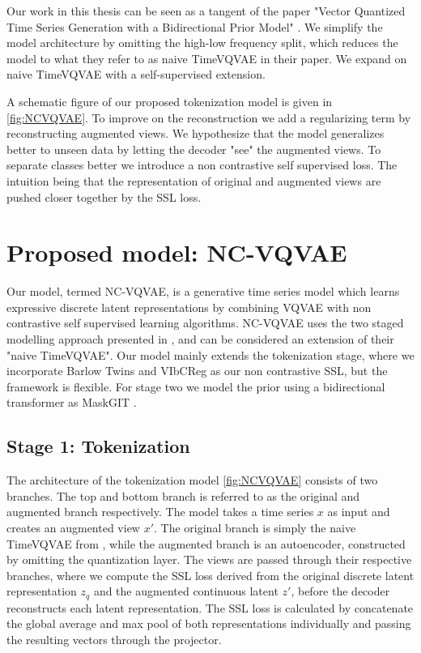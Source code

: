 \documentclass[../../thesis.tex]{subfiles}
\begin{document}
Our work in this thesis can be seen as a tangent of the paper "Vector Quantized Time Series Generation with a Bidirectional Prior Model" \cite{TimeVQVAE}. 
We simplify the model architecture by omitting the high-low frequency split, which reduces the model to what they refer to as naive TimeVQVAE in their paper. We expand on naive TimeVQVAE  with a self-supervised extension. \newline

A schematic figure of our proposed tokenization model is given in \ref{fig:NCVQVAE}. To improve on the reconstruction we add a regularizing term by reconstructing augmented views. We hypothesize that the model generalizes better to unseen data by letting the decoder "see" the augmented views.\newline
To separate classes better we introduce a non contrastive self supervised loss. The intuition being that the representation of original and augmented views are pushed closer together by the SSL loss.\newline

\section{Proposed model: NC-VQVAE}

Our model, termed NC-VQVAE, is a generative time series model which learns expressive discrete latent representations by combining VQVAE \cite{VQVAE} with non contrastive self supervised learning algorithms. NC-VQVAE uses the two staged modelling approach presented in \cite{TimeVQVAE}, and can be considered an extension of their "naive TimeVQVAE". Our model mainly extends the tokenization stage, where we incorporate Barlow Twins \cite{zbontar2021barlow} and VIbCReg \cite{lee2024computer} as our non contrastive SSL, but the framework is flexible. For stage two we model the prior using a bidirectional transformer as MaskGIT \cite{chang2022maskgit}.

\subsection{Stage 1: Tokenization}

The architecture of the tokenization model \ref{fig:NCVQVAE} consists of two branches. The top and bottom branch is referred to as the original and augmented branch respectively. The model takes a time series $x$ as input and creates an augmented view $x'$. The original branch is simply the naive TimeVQVAE from \cite{TimeVQVAE}, while the augmented branch is an autoencoder, constructed by omitting the quantization layer. The views are passed through their respective branches, where we compute the SSL loss derived from the original discrete latent representation $z_q$ and the augmented continuous latent $z'$, before the decoder reconstructs each latent representation. \newline 
The SSL loss is calculated by concatenate the global average and max pool of both representations individually and passing the resulting vectors through the projector. \newline
\end{document}
